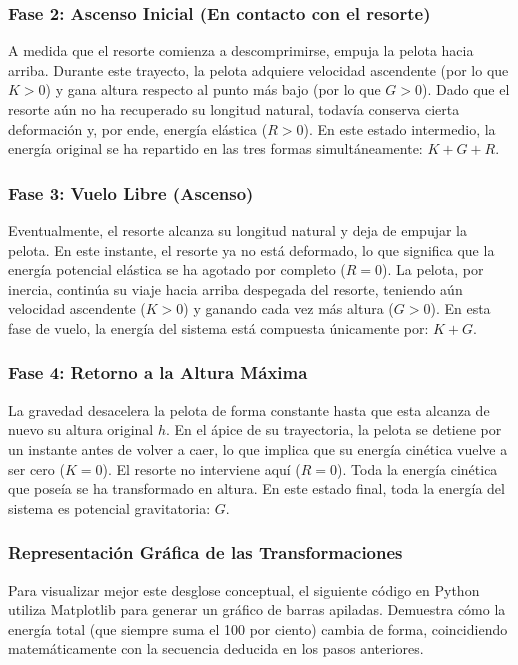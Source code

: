 \documentclass[12pt, a4paper]{article}
\begin{document}
\subsubsection*{Fase 2: Ascenso Inicial (En contacto con el resorte)}

A medida que el resorte comienza a descomprimirse, empuja la pelota hacia arriba. Durante este trayecto, la pelota adquiere velocidad ascendente (por lo que $K > 0$) y gana altura respecto al punto más bajo (por lo que $G > 0$). Dado que el resorte aún no ha recuperado su longitud natural, todavía conserva cierta deformación y, por ende, energía elástica ($R > 0$). 
En este estado intermedio, la energía original se ha repartido en las tres formas simultáneamente: $K + G + R$.

\subsubsection*{Fase 3: Vuelo Libre (Ascenso)}

Eventualmente, el resorte alcanza su longitud natural y deja de empujar la pelota. En este instante, el resorte ya no está deformado, lo que significa que la energía potencial elástica se ha agotado por completo ($R=0$). La pelota, por inercia, continúa su viaje hacia arriba despegada del resorte, teniendo aún velocidad ascendente ($K > 0$) y ganando cada vez más altura ($G > 0$).
En esta fase de vuelo, la energía del sistema está compuesta únicamente por: $K + G$.

\subsubsection*{Fase 4: Retorno a la Altura Máxima}

La gravedad desacelera la pelota de forma constante hasta que esta alcanza de nuevo su altura original $h$. En el ápice de su trayectoria, la pelota se detiene por un instante antes de volver a caer, lo que implica que su energía cinética vuelve a ser cero ($K=0$). El resorte no interviene aquí ($R=0$). Toda la energía cinética que poseía se ha transformado en altura.
En este estado final, toda la energía del sistema es potencial gravitatoria: $G$.

\subsubsection*{Representación Gráfica de las Transformaciones}

Para visualizar mejor este desglose conceptual, el siguiente código en Python utiliza Matplotlib para generar un gráfico de barras apiladas. Demuestra cómo la energía total (que siempre suma el 100 por ciento) cambia de forma, coincidiendo matemáticamente con la secuencia deducida en los pasos anteriores.
\end{document}

